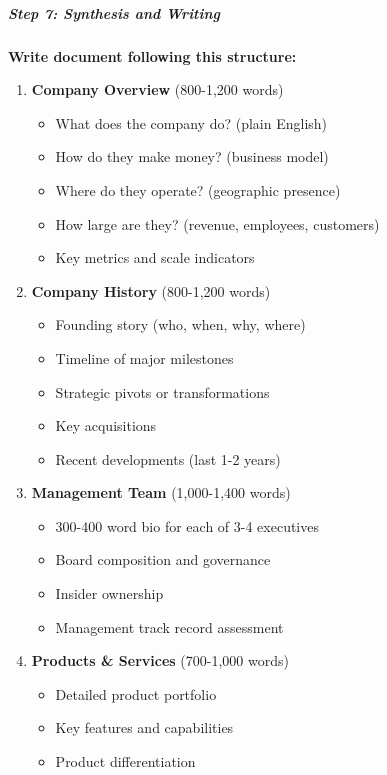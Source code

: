 \documentclass[11pt]{article}
\begin{document}
\subparagraph{Step 7: Synthesis and Writing}\mbox{}\par

\textbf{Write document following this structure:}


\begin{enumerate}[leftmargin=*,itemsep=2pt,topsep=2pt]
\item {} \textbf{Company Overview} (800-1,200 words)
\begin{itemize}[leftmargin=*,itemsep=2pt,topsep=2pt]
\item {} What does the company do? (plain English)
\item {} How do they make money? (business model)
\item {} Where do they operate? (geographic presence)
\item {} How large are they? (revenue, employees, customers)
\item {} Key metrics and scale indicators
\end{itemize}
\item {} \textbf{Company History} (800-1,200 words)
\begin{itemize}[leftmargin=*,itemsep=2pt,topsep=2pt]
\item {} Founding story (who, when, why, where)
\item {} Timeline of major milestones
\item {} Strategic pivots or transformations
\item {} Key acquisitions
\item {} Recent developments (last 1-2 years)
\end{itemize}
\item {} \textbf{Management Team} (1,000-1,400 words)
\begin{itemize}[leftmargin=*,itemsep=2pt,topsep=2pt]
\item {} 300-400 word bio for each of 3-4 executives
\item {} Board composition and governance
\item {} Insider ownership
\item {} Management track record assessment
\end{itemize}
\item {} \textbf{Products \& Services} (700-1,000 words)
\begin{itemize}[leftmargin=*,itemsep=2pt,topsep=2pt]
\item {} Detailed product portfolio
\item {} Key features and capabilities
\item {} Product differentiation

\end{itemize}
\end{enumerate}
\end{document}
